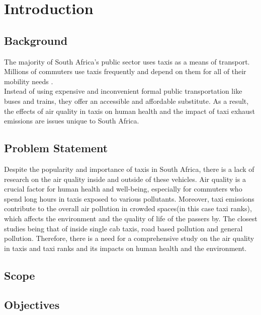 \graphicspath{{introduction/fig/}}

\chapter{Introduction}
\label{chap:introduction}

\section{Background}
The majority of South Africa's public sector uses taxis as a means of transport. Millions of commuters use taxis frequently and depend on them for all of their mobility needs \cite{depttransport2023}.\\
Instead of using expensive and inconvenient formal public transportation like buses and trains, they offer an accessible and affordable substitute.
As a result, the effects of air quality in taxis on human health and the impact of taxi exhaust emissions are issues unique to South Africa.




\section{Problem Statement}
Despite the popularity and importance of taxis in South Africa, there is a lack of research on the air quality inside and outside of these vehicles. 
Air quality is a crucial factor for human health and well-being, especially for commuters who spend long hours in taxis exposed to various pollutants.
Moreover, taxi emissions contribute to the overall air pollution in crowded spaces(in this case taxi ranks), which affects the environment and the quality of life of the passers by. The closest studies being that of inside single cab taxis\cite{insidetaxismall}, road based pollution\cite{taxiNetwork} and general pollution\cite{Environmentalimpact}.
Therefore, there is a need for a comprehensive study on the air quality in taxis and taxi ranks and its impacts on human health and the environment.


\section{Scope}
\section{Objectives}
